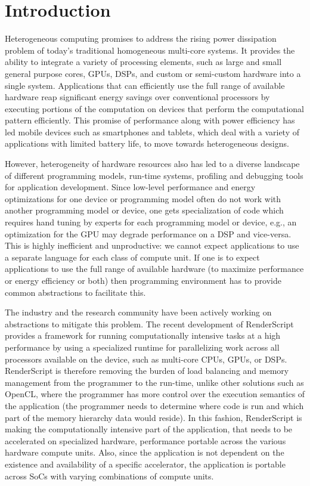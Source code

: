 \section{Introduction}

Heterogeneous computing promises to address the rising power dissipation problem
of today's traditional homogeneous multi-core
systems. It provides the ability to integrate a variety of processing elements,
such as large and small general purpose cores, GPUs, DSPs, and custom or
semi-custom hardware into a single system. Applications that can efficiently use
the full range of available hardware reap significant energy
savings over conventional processors by executing portions of the computation on
devices that perform the computational pattern efficiently.
This promise of performance along with power efficiency
has led mobile devices such as smartphones
and tablets, which deal with a variety of applications with limited battery
life, to move towards heterogeneous designs.

However, heterogeneity of hardware resources also has led to a diverse landscape
of different programming models, run-time systems, profiling and debugging tools
for application development. Since low-level performance and energy
optimizations for one device or
programming model often do not work with another programming model or device, 
one gets specialization of code which requires hand tuning by experts for each 
programming model or device, e.g., an optimization for the GPU may degrade performance
on a DSP and vice-versa. This is highly inefficient and
unproductive: we cannot expect applications to use a separate language for each
class of compute unit. If one is to expect applications to use the full range of
available hardware (to maximize performance or energy efficiency or both) then
programming environment has to provide common abstractions to facilitate this.

The industry and the research community have been actively working on abstractions
    to mitigate this problem.
The recent development of RenderScript~\cite{wiki:RenderScript, RenderScript}
provides a framework for running computationally intensive tasks at a high
performance by using a specialized runtime for parallelizing work across all
processors available on the device, such as multi-core CPUs, GPUs, or DSPs.
RenderScript is therefore removing the burden of load balancing and memory
management from the programmer to the run-time, unlike other solutions such as
OpenCL, where the programmer has more control over the execution semantics of
the application (the programmer needs to determine where code is run and
 which part of the memory hierarchy data would reside).  In this fashion,
RenderScript is making the computationally intensive part of the application,
that needs to be accelerated on specialized hardware, performance portable
across the various hardware compute units. Also, since the application is not
dependent on the existence and availability of a specific accelerator, the
application is portable across SoCs with varying combinations of compute units.

